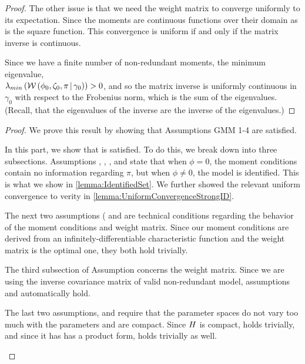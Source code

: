 \documentclass[11pt, letterpaper, twoside, final]{article}
\begin{document}
\begin{appendices}
\begin{proof}
    The other issue is that we need the weight matrix to converge uniformly to its expectation.
    Since the moments are continuous functions over their domain as is the square function.
    This convergence is uniform if and only if the matrix inverse is continuous.
    
    Since we have a finite number of non-redundant moments, the minimum eigenvalue, \\
    $\lambda_{min}\left(\mathcal{W}\left(\phi_0, \zeta_0, \pi \,\middle\vert\, \gamma_0\right)\right) > 0$, and so the matrix inverse
    is uniformly continuous in $\gamma_0$ with respect to the Frobenius norm, which is the sum of the eigenvalues.
    (Recall, that the eigenvalues of the inverse are the inverse of the eigenvalues.)


\end{proof}

\InferenceWeakID*

\begin{proof}
We prove this result by showing that Assumptions GMM 1-4 are satisfied.

\begin{proofpart}
    \label{part:main_theorem_proof_part1}
    In this part, we show that  is satisfied. 
    To do this, we break   down into three subsections.
    Assumptions , , , and  state
    that when $\phi = 0$, the moment conditions contain no information regarding $\pi$, but when $\phi \neq 0$,
    the model is identified.
    This is what we show in \cref{lemma:IdentifiedSet}.
    We further showed the relevant uniform convergence to verity  in
    \cref{lemma:UniformConvergenceStrongID}.
    
    The next two assumptions ( and  are  technical conditions regarding the
    behavior of the moment conditions and weight matrix. 
    Since our moment conditions are derived from an infinitely-differentiable  characteristic function and the
    weight matrix is the optimal one, they both hold trivially.
    
    The third subsection of Assumption  concerns the weight matrix.
    Since we are using the inverse covariance matrix of valid non-redundant model, assumptions
     and  automatically hold.
    
    The last two assumptions,  and  require that the parameter spaces do
    not vary too much with the parameters and are compact.
    Since $H$ is compact,  holds trivially, and since it has  has a product form,
      holds trivially as well.
    

\end{proofpart}
\end{proof}
\end{appendices}
\end{document}
